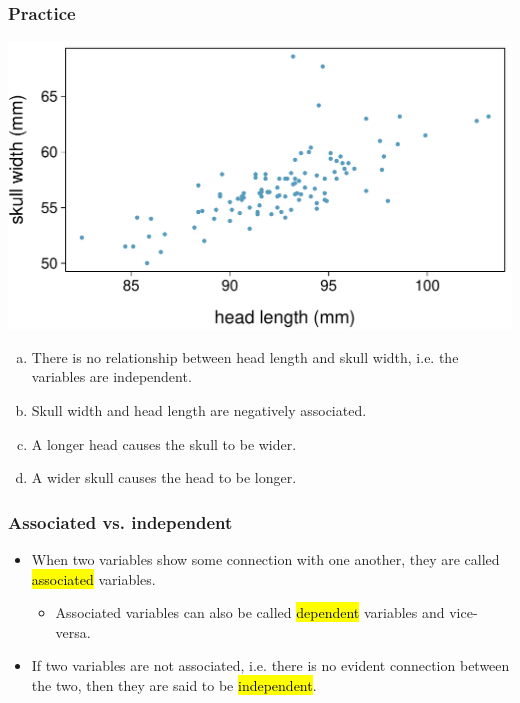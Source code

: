 \begin{frame}
\frametitle{Practice}

{
}
{
\includegraphics[width=\textwidth]{1-2_data_basics/figures/possum_head_skull/possum_head_skull}
}

\begin{enumerate}[(a)]
\item There is no relationship between head length and skull width, i.e. the variables are independent.
\item Skull width and head length are negatively associated.
\item A longer head causes the skull to be wider.
\item A wider skull causes the head to be longer.
\end{enumerate}

\end{frame}


\begin{frame}
\frametitle{Associated vs. independent}

\begin{itemize}

\item When two variables show some connection with one another, they are called \hl{associated} variables.
\begin{itemize}
\item Associated variables can also be called \hl{dependent} variables and vice-versa.
\end{itemize}

\item If two variables are not associated, i.e. there is no evident connection between the two, then they are said to be \hl{independent}.

\end{itemize}

\end{frame}

